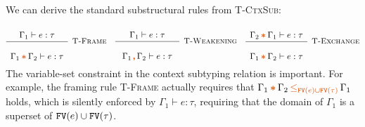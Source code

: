 \begin{example} We can derive the standard
  substructural rules from \textsc{T-CtxSub}: \vspace{-0.4em}
  \begin{align*}
    \mprooftr{25mm}
      {$\Gamma_1 \vdash e : \tau$}
      {T-Frame}
      {$\Gamma_1 \ctstar \Gamma_2 \vdash e : \tau$}
    \quad
    \mprooftr{26mm}
      {$\Gamma_1 \vdash e : \tau$}
      {T-Weakening}
      {$\Gamma_1 \ctcomma \Gamma_2 \vdash e : \tau$}
    \quad
    \mprooftr{25mm}
      {$\Gamma_2 \ctstar \Gamma_1 \vdash e : \tau$}
      {T-Exchange}
      {$\Gamma_1 \ctstar \Gamma_2 \vdash e : \tau$}
    \end{align*}\noindent
    The variable-set constraint in the context subtyping relation is
    important.  For example, the framing rule \textsc{T-Frame}
    actually requires that
    $\Gamma_1 \ctstar \Gamma_2 \ctsubseteq{\Code{FV}(e) \cup
      \Code{FV}(\tau)} \Gamma_1$ holds, which is silently enforced by
    $\Gamma_1 \vdash e : \tau$, requiring that the domain of
    $\Gamma_1$ is a superset of ${\tt FV}(e) \cup {\tt FV}(\tau)$.
\end{example}

